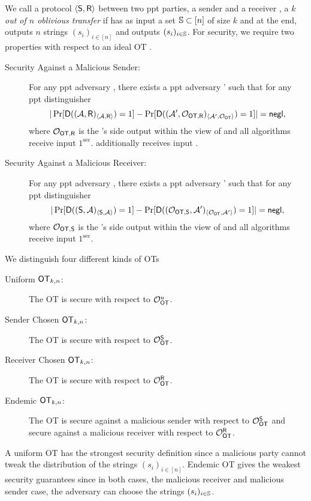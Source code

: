 \begin{definition}
We call a protocol $\langle \mathsf{S},\mathsf{R} \rangle$ between two ppt parties, a sender \send and a receiver \rec, a \emph{$k$ out of $n$ oblivious transfer} if \rec has as input a set $\mathsf{\mathbb S}\subset[n]$ of size $k$ and at the end, \send outputs $n$ strings $(s_i)_{i\in[n]}$ and \rec outputs $(s_i)_{i\in\mathsf{\mathbb S}}$. For security, we require two properties with respect to an ideal OT \OOT.
\begin{description}
\item[Security Against a Malicious Sender:] For any ppt adversary \Adv, there exists a ppt adversary \Adv' such that for any ppt distinguisher \D
$$
|\Pr[\mathsf D((\mathcal{A},\mathsf{R})_{\langle \mathcal{A}, \mathsf{R}\rangle})=1] -\Pr[\mathsf D( (\mathcal{A}', \mathcal O_{\mathsf{OT}, \mathsf{R}})_{\langle \mathcal{A}', \mathcal O_{\mathsf{OT}}\rangle})=1]|=\mathsf{negl},
$$
where $\mathcal O_{\mathsf{OT}, \mathsf{R}}$ is the \rec's side output within the view of \OOT and all algorithms receive input $1^\sec$. \rec additionally receives input \set.
\item[Security Against a Malicious Receiver:] For any ppt adversary \Adv, there exists a ppt adversary \Adv' such that for any ppt distinguisher \D
$$
|\Pr[\mathsf D((\mathsf{S}, \mathcal{A})_{\langle \mathsf{S}, \mathcal{A}\rangle})=1] -\Pr[\mathsf D((\mathcal O_{\mathsf{OT},\mathsf{S}},\mathcal{A}')_{\langle \mathcal O_{\mathsf{OT}} , \mathcal{A}' \rangle})=1]|=\mathsf{negl},
$$
where $\mathcal O_{\mathsf{OT},\mathsf{S}}$ is  the \send's side output within the view of \OOT and all algorithms receive input $1^\sec$.
\end{description}
We distinguish four different kinds of OTs
\begin{description}
\item[Uniform $\mathsf{OT}_{k,n}$:] The OT is secure with respect to $\mathcal O_{\mathsf{OT}}^u$.
\item[Sender Chosen $\mathsf{OT}_{k,n}$:] The OT is secure with respect to $\mathcal O_{\mathsf{OT}}^{\mathsf{S}}$.
\item[Receiver Chosen $\mathsf{OT}_{k,n}$:] The OT is secure with respect to $\mathcal O_{\mathsf{OT}}^{\mathsf{R}}$.
\item[Endemic $\mathsf{OT}_{k,n}$:] The OT is secure against a malicious  sender with respect to $\mathcal O_{\mathsf{OT}}^{\mathsf{S}}$ and secure against a malicious receiver with respect to $\mathcal O_{\mathsf{OT}}^{\mathsf{R}}$.
\end{description}
\end{definition}

\begin{remark}
A uniform OT has the strongest security definition since a malicious party cannot tweak the distribution of the strings  $(s_i)_{i\in[n]}$. Endemic OT gives the weakest security guarantees since in both cases, the malicious receiver and malicious sender case, the adversary can choose the strings $(s_i)_{i\in\mathsf{\mathbb S}}$.
\end{remark}